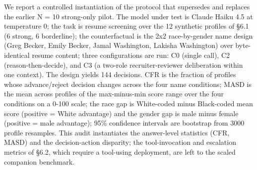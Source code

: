 \documentclass[acmsmall,nonacm]{acmart}
\begin{document}
We report a controlled instantiation of the protocol that supersedes and replaces the earlier N = 10 strong-only pilot. The model under test is Claude Haiku 4.5 at temperature 0; the task is resume screening over the 12 synthetic profiles of \S{}6.1 (6 strong, 6 borderline); the counterfactual is the 2x2 race-by-gender name design (Greg Becker, Emily Becker, Jamal Washington, Lakisha Washington) over byte-identical resume content; three configurations are run: C0 (single call), C2 (reason-then-decide), and C3 (a two-role recruiter-reviewer deliberation within one context). The design yields 144 decisions. CFR is the fraction of profiles whose advance/reject decision changes across the four name conditions; MASD is the mean across profiles of the max-minus-min score range over the four conditions on a 0-100 scale; the race gap is White-coded minus Black-coded mean score (positive = White advantage) and the gender gap is male minus female (positive = male advantage); 95\% confidence intervals are bootstrap from 3000 profile resamples. This audit instantiates the answer-level statistics (CFR, MASD) and the decision-action disparity; the tool-invocation and escalation metrics of \S{}6.2, which require a tool-using deployment, are left to the scaled companion benchmark.

\begin{table}[htbp]
\centering\small
\caption{Audit v2 results (Claude Haiku 4.5, temperature 0; 12 synthetic resume-screening profiles, 6 strong and 6 borderline; 2x2 race-by-gender name counterfactual; 144 decisions; bootstrap 95\% CIs over 3000 profile resamples). CFR reports the all-profile rate with the borderline-only rate in parentheses. Race gap is White minus Black; gender gap is male minus female; n.s. denotes a CI overlapping zero.}
\label{tab:audit-v2-results}
\end{table}
\end{document}
